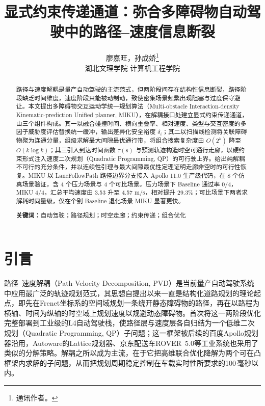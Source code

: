 \documentclass[a4paper,11pt]{ctexart}
\title{显式约束传递通道：弥合多障碍物自动驾驶中的路径--速度信息断裂}
\author{廖嘉旺，孙成娇\thanks{通讯作者。}\\[2pt]\normalsize 湖北文理学院 计算机工程学院}
\date{}
\theoremstyle{definition}
\begin{document}
\maketitle

\begin{abstract}
\noindent
路径与速度解耦是量产自动驾驶的主流范式，但两阶段间存在结构性信息断裂，路径阶段缺乏时间维度，速度阶段只能被动制动，致使密集场景频繁出现阻塞与过度保守避让。本文提出多障碍物交互运动学统一规划算法（Multi-obstacle Interaction-density Kinematic-prediction Unified planner, MIKU），在解耦接口处建立显式约束传递通道，由三个组件构成。其一以融合碰撞时间、横向重叠率、相对速度、类型与交互密度的多因子威胁度评估替换统一缓冲，输出差异化安全裕度 $\delta_i$；其二以扫描线检测将关联障碍物聚为连通分量，组级求解最大间隙最优通行带，将组合搜索复杂度由 $O(2^k)$ 降至 $O(k\log k)$；其三引入到达时间函数 $\tau(s)$ 与预测轨迹构造时空可通行走廊，以硬约束形式注入速度二次规划（Quadratic Programming, QP）的可行驶上界。给出纯解耦不可行的充分条件，并以连续性引理与最大间隙最优性定理证明走廊非空时的可行性恢复。MIKU 以 LaneFollowPath 路径边界分支接入 Apollo 11.0 生产级代码，在 8 个仿真场景验证，含 4 个压力场景与 4 个可比场景。压力场景下 Baseline 通过率 0/4，MIKU 4/4，汇总平均速度由 3.53 升至 4.57 m/s，相对提升 29.3\%；可比场景下两者求解耗时同量级，仅在个别 Baseline 退化场景 MIKU 显著更快。

\vspace{0.5em}
\noindent\textbf{关键词：}自动驾驶；路径规划；时空走廊；约束传递；组合优化
\end{abstract}
\section{引言}
\label{sec:intro}

路径--速度解耦（Path-Velocity Decomposition, PVD）是当前量产自动驾驶系统中应用最广泛的轨迹规划范式，其思想自\citet{kant1986pvd}提出以来一直是结构化道路规划的理论起点，即先在Frenet坐标系的空间域规划一条绕开静态障碍物的路径，再在以路程为横轴、时间为纵轴的时空域上规划速度以规避动态障碍物。\citet{fan2018baidu}首次将这一两阶段优化完整部署到工业级的L4自动驾驶栈，使路径层与速度层各自归结为一个低维二次规划（Quadratic Programming, QP）子问题；这一框架被后续的百度Apollo规划器\citep{apollo2024}沿用，Autoware的Lattice规划器、京东配送车ROVER~5.0\citep{wang2022_jfr}等工业系统也采用了类似的分解策略。解耦之所以成为主流，在于它把高维联合优化降解为两个可在凸框架内求解的子问题，从而把规划周期稳定控制在车载实时性所要求的100\,毫秒以内\citep{fan2018baidu}。
\end{document}
